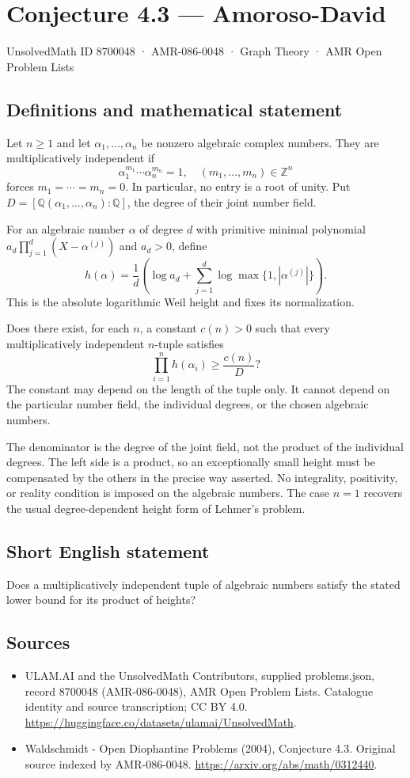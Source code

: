 \documentclass[11pt,a4paper]{article}
\begin{document}
\section*{Conjecture 4.3 — Amoroso-David}\label{8700048}
{\small UnsolvedMath ID 8700048 · AMR-086-0048 · Graph Theory · AMR Open Problem Lists}
\subsection{Definitions and mathematical statement}
Let $n\ge1$ and let $\alpha_1,\ldots,\alpha_n$ be nonzero algebraic complex numbers. They are multiplicatively independent if
\[
\alpha_1^{m_1}\cdots\alpha_n^{m_n}=1,\quad(m_1,\ldots,m_n)\in\mathbb Z^n
\]
forces $m_1=\cdots=m_n=0$. In particular, no entry is a root of unity. Put $D=[\mathbb Q(\alpha_1,\ldots,\alpha_n):\mathbb Q]$, the degree of their joint number field.

For an algebraic number $\alpha$ of degree $d$ with primitive minimal polynomial $a_d\prod_{j=1}^d(X-\alpha^{(j)})$ and $a_d>0$, define
\[
h(\alpha)=\frac1d\left(\log a_d+\sum_{j=1}^d
\log\max\{1,|\alpha^{(j)}|\}\right).
\]
This is the absolute logarithmic Weil height and fixes its normalization.

Does there exist, for each $n$, a constant $c(n)>0$ such that every multiplicatively independent $n$-tuple satisfies
\[
\prod_{i=1}^n h(\alpha_i)\ge\frac{c(n)}D?
\]
The constant may depend on the length of the tuple only. It cannot depend on the particular number field, the individual degrees, or the chosen algebraic numbers.

The denominator is the degree of the joint field, not the product of the individual degrees. The left side is a product, so an exceptionally small height must be compensated by the others in the precise way asserted. No integrality, positivity, or reality condition is imposed on the algebraic numbers. The case $n=1$ recovers the usual degree-dependent height form of Lehmer's problem.
\subsection{Short English statement}
Does a multiplicatively independent tuple of algebraic numbers satisfy the stated lower bound for its product of heights?
\subsection{Sources}
\begin{itemize}
\item[S1] ULAM.AI and the UnsolvedMath Contributors, supplied problems.json, record 8700048 (AMR-086-0048), AMR Open Problem Lists. Catalogue identity and source transcription; CC BY 4.0.
\url{https://huggingface.co/datasets/ulamai/UnsolvedMath}.
\item[S2] Waldschmidt - Open Diophantine Problems (2004), Conjecture 4.3. Original source indexed by AMR-086-0048.
\url{https://arxiv.org/abs/math/0312440}.
\end{itemize}
\end{document}
